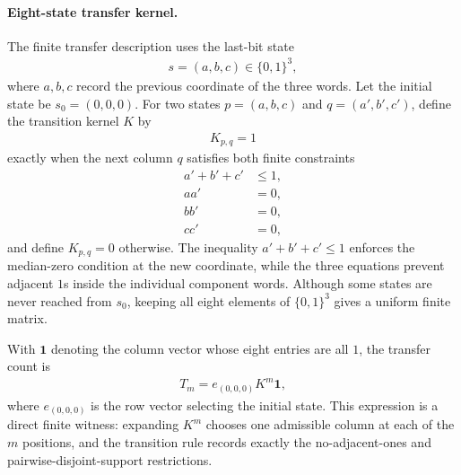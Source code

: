 \paragraph{Eight-state transfer kernel.}
The finite transfer description uses the last-bit state
$$
\begin{aligned}
s=(a,b,c)\in \{0,1\}^3,
\end{aligned}
$$
where $a,b,c$ record the previous coordinate of the three words. Let the initial state be $s_0=(0,0,0)$. For two states $p=(a,b,c)$ and $q=(a',b',c')$, define the transition kernel $K$ by
$$
\begin{aligned}
K_{p,q}=1
\end{aligned}
$$
exactly when the next column $q$ satisfies both finite constraints
$$
\begin{aligned}
a'+b'+c'&\leq 1,\\
aa'&=0,\\
bb'&=0,\\
cc'&=0,
\end{aligned}
$$
and define $K_{p,q}=0$ otherwise. The inequality $a'+b'+c'\leq 1$ enforces the median-zero condition at the new coordinate, while the three equations prevent adjacent $1$s inside the individual component words. Although some states are never reached from $s_0$, keeping all eight elements of $\{0,1\}^3$ gives a uniform finite matrix.

With $\mathbf{1}$ denoting the column vector whose eight entries are all $1$, the transfer count is
$$
\begin{aligned}
T_m=e_{(0,0,0)}K^m\mathbf{1},
\end{aligned}
$$
where $e_{(0,0,0)}$ is the row vector selecting the initial state. This expression is a direct finite witness: expanding $K^m$ chooses one admissible column at each of the $m$ positions, and the transition rule records exactly the no-adjacent-ones and pairwise-disjoint-support restrictions.


